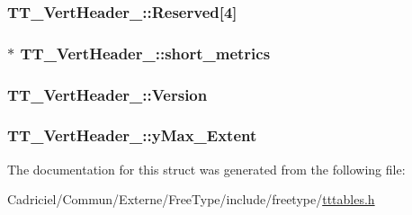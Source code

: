 \hypertarget{struct_t_t___vert_header___a54930b56bb8be0a8eb22753a9242fc5f}{
\subsubsection[{Reserved}]{ T\-T\-\_\-\-Vert\-Header\-\_\-\-::\-Reserved\mbox{[}4\mbox{]}}}\label{struct_t_t___vert_header___a54930b56bb8be0a8eb22753a9242fc5f}
\hypertarget{struct_t_t___vert_header___ad5e875c19a02b0f6777db1c122bff2f3}{
\subsubsection[{short\-\_\-metrics}]{$\ast$ T\-T\-\_\-\-Vert\-Header\-\_\-\-::short\-\_\-metrics}}\label{struct_t_t___vert_header___ad5e875c19a02b0f6777db1c122bff2f3}
\hypertarget{struct_t_t___vert_header___a32d736621b757e9a39a15f2f82d15b9c}{
\subsubsection[{Version}]{ T\-T\-\_\-\-Vert\-Header\-\_\-\-::\-Version}}\label{struct_t_t___vert_header___a32d736621b757e9a39a15f2f82d15b9c}
\hypertarget{struct_t_t___vert_header___af6927e95c1dfbe90c2e76b1eef521d53}{
\subsubsection[{y\-Max\-\_\-\-Extent}]{ T\-T\-\_\-\-Vert\-Header\-\_\-\-::y\-Max\-\_\-\-Extent}}\label{struct_t_t___vert_header___af6927e95c1dfbe90c2e76b1eef521d53}


The documentation for this struct was generated from the following file\-:\begin{DoxyCompactItemize}
\item 
Cadriciel/\-Commun/\-Externe/\-Free\-Type/include/freetype/\hyperlink{tttables_8h}{tttables.\-h}\end{DoxyCompactItemize}

